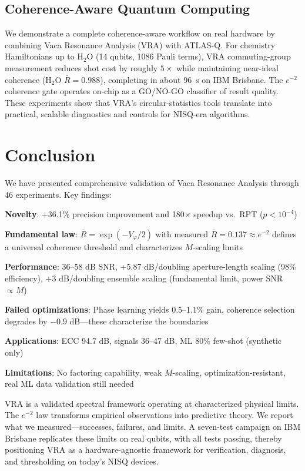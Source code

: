 \documentclass[10pt,twocolumn]{article}
\begin{document}
\subsection{Coherence-Aware Quantum Computing}

We demonstrate a complete coherence-aware workflow on real hardware by combining Vaca Resonance Analysis (VRA) with ATLAS-Q. For chemistry Hamiltonians up to H$_2$O (14 qubits, 1086 Pauli terms), VRA commuting-group measurement reduces shot cost by roughly $5\times$ while maintaining near-ideal coherence (H$_2$O $\bar{R} = 0.988$), completing in about 96~s on IBM Brisbane. The $e^{-2}$ coherence gate operates on-chip as a GO/NO-GO classifier of result quality. These experiments show that VRA's circular-statistics tools translate into practical, scalable diagnostics and controls for NISQ-era algorithms.

\section{Conclusion}

We have presented comprehensive validation of Vaca Resonance Analysis through 46 experiments. Key findings:

\textbf{Novelty}: +36.1\% precision improvement and 180$\times$ speedup vs.\ RPT ($p < 10^{-4}$)

\textbf{Fundamental law}: $\bar{R} = \exp({-}V_\varphi/2)$ with measured $\bar{R} = 0.137 \approx e^{-2}$ defines a universal coherence threshold and characterizes $M$-scaling limits

\textbf{Performance}: 36--58 dB SNR, +5.87 dB/doubling aperture-length scaling (98\% efficiency), +3 dB/doubling ensemble scaling (fundamental limit, power SNR $\propto M$)

\textbf{Failed optimizations}: Phase learning yields 0.5--1.1\% gain, coherence selection degrades by $-$0.9 dB---these characterize the boundaries

\textbf{Applications}: ECC 94.7 dB, signals 36--47 dB, ML 80\% few-shot (synthetic only)

\textbf{Limitations}: No factoring capability, weak $M$-scaling, optimization-resistant, real ML data validation still needed

VRA is a validated spectral framework operating at characterized physical limits. The $e^{-2}$ law transforms empirical observations into predictive theory. We report what we measured---successes, failures, and limits. A seven-test campaign on IBM Brisbane replicates these limits on real qubits, with all tests passing, thereby positioning VRA as a hardware-agnostic framework for verification, diagnosis, and thresholding on today's NISQ devices.
\end{document}
